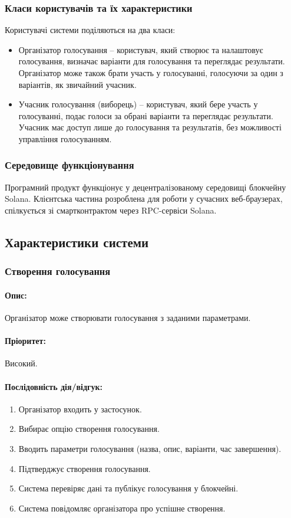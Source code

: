 \documentclass[14pt]{extreport}
\begin{document}
  \subsubsection{Класи користувачів та їх характеристики}
  Користувачі системи поділяються на два класи:
  \begin{itemize}
    \item Організатор голосування – користувач, який створює та налаштовує голосування, визначає варіанти для голосування та переглядає результати. Організатор може також брати участь у голосуванні, голосуючи за один з варіантів, як звичайний учасник.
    \item Учасник голосування (виборець) – користувач, який бере участь у голосуванні, подає голоси за обрані варіанти та переглядає результати. Учасник має доступ лише до голосування та результатів, без можливості управління голосуванням.
  \end{itemize}
  
  \subsubsection{Середовище функціонування}
  Програмний продукт функціонує у децентралізованому середовищі блокчейну Solana. Клієнтська частина розроблена для роботи у сучасних веб-браузерах, спілкується зі смартконтрактом через RPC-сервіси Solana.

  \subsection{Характеристики системи}
  \subsubsection{Створення голосування}  
  \paragraph{Опис:} Організатор може створювати голосування з заданими параметрами.  
  \paragraph{Пріоритет:} Високий.  
  \paragraph{Послідовність дія/відгук:}  
  \begin{enumerate}  
      \item Організатор входить у застосунок.  
      \item Вибирає опцію створення голосування.  
      \item Вводить параметри голосування (назва, опис, варіанти, час завершення).  
      \item Підтверджує створення голосування.  
      \item Система перевіряє дані та публікує голосування у блокчейні.  
      \item Система повідомляє організатора про успішне створення.  
  \end{enumerate}
\end{document}
